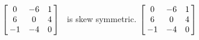 {$\left[\hskip -3pt \begin{array}{ccc} 0&-6&1\\  6&0&4
\\  -1&-4&0\end{array}\hskip -3pt \right]$} 
{\tta\ is skew symmetric. $\left[\hskip -3pt \begin{array}{ccc} 0&-6&1\\  6&0&4\\  -1&-4&0\end{array}\hskip -3pt \right]
$}



  

